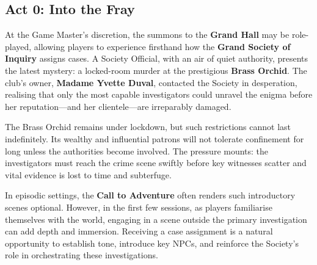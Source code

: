 \subsection{Act 0: Into the Fray}

At the Game Master's discretion, the summons to the \textbf{Grand Hall} may be role-played, allowing players to experience firsthand how the \textbf{Grand Society of Inquiry} assigns cases. A Society Official, with an air of quiet authority, presents the latest mystery: a locked-room murder at the prestigious \textbf{Brass Orchid}. The club’s owner, \textbf{Madame Yvette Duval}, contacted the Society in desperation, realising that only the most capable investigators could unravel the enigma before her reputation—and her clientele—are irreparably damaged.

The Brass Orchid remains under lockdown, but such restrictions cannot last indefinitely. Its wealthy and influential patrons will not tolerate confinement for long unless the authorities become involved. The pressure mounts: the investigators must reach the crime scene swiftly before key witnesses scatter and vital evidence is lost to time and subterfuge.

\begin{GmTips}
	In episodic settings, the \textbf{Call to Adventure} often renders such introductory scenes optional. However, in the first few sessions, as players familiarise themselves with the world, engaging in a scene outside the primary investigation can add depth and immersion. Receiving a case assignment is a natural opportunity to establish tone, introduce key NPCs, and reinforce the Society’s role in orchestrating these investigations.
\end{GmTips}
